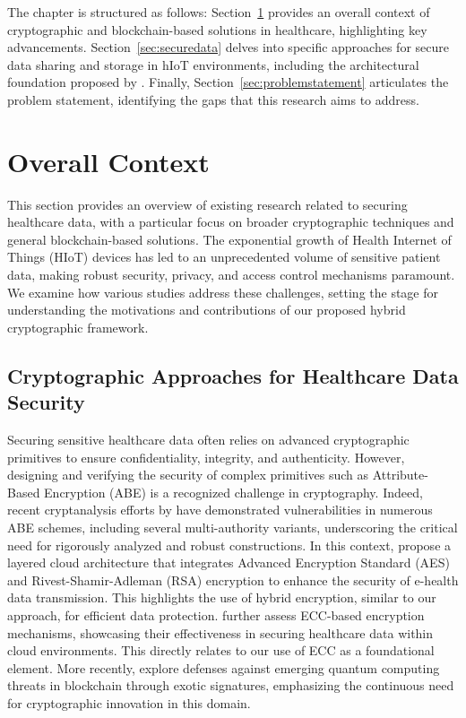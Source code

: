 \documentclass[cic,tc,english]{iiufrgs}
\begin{document}
    The chapter is structured as follows: Section~\ref{sec:overallcontext} provides an overall context of cryptographic and blockchain-based solutions in healthcare, highlighting key advancements. Section~\ref{sec:securedata} delves into specific approaches for secure data sharing and storage in hIoT environments, including the architectural foundation proposed by \citet{laura2023}. Finally, Section~\ref{sec:problemstatement} articulates the problem statement, identifying the gaps that this research aims to address.

    \section{Overall Context}
    \label{sec:overallcontext}

        This section provides an overview of existing research related to securing healthcare data, with a particular focus on broader cryptographic techniques and general blockchain-based solutions. The exponential growth of Health Internet of Things (HIoT) devices has led to an unprecedented volume of sensitive patient data, making robust security, privacy, and access control mechanisms paramount. We examine how various studies address these challenges, setting the stage for understanding the motivations and contributions of our proposed hybrid cryptographic framework.

        \subsection{Cryptographic Approaches for Healthcare Data Security}
            Securing sensitive healthcare data often relies on advanced cryptographic primitives to ensure confidentiality, integrity, and authenticity. However, designing and verifying the security of complex primitives such as Attribute-Based Encryption (ABE) is a recognized challenge in cryptography. Indeed, recent cryptanalysis efforts by \citet{broken2020} have demonstrated vulnerabilities in numerous ABE schemes, including several multi-authority variants, underscoring the critical need for rigorously analyzed and robust constructions. In this context, \citet{Memos2021} propose a layered cloud architecture that integrates Advanced Encryption Standard (AES) and Rivest-Shamir-Adleman (RSA) encryption to enhance the security of e-health data transmission. This highlights the use of hybrid encryption, similar to our approach, for efficient data protection. \citet{Hema2019} further assess ECC-based encryption mechanisms, showcasing their effectiveness in securing healthcare data within cloud environments. This directly relates to our use of ECC as a foundational element. More recently, \citet{Naz2024} explore defenses against emerging quantum computing threats in blockchain through exotic signatures, emphasizing the continuous need for cryptographic innovation in this domain.
\end{document}

